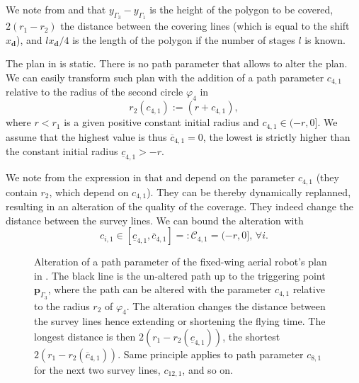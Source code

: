 We note from  and  that $y_{\Gamma_3}-y_{\Gamma_1}$ is the height of the polygon to be covered, $2(r_1-r_2)$ the distance between the covering lines (which is equal to the shift $x_\mathbf{d}$), and $lx_\mathbf{d}/4$ is the length of the polygon if the number of stages $l$ is known.

The plan in  is static. There is no path parameter that allows to alter the plan. We can easily transform such plan with the addition of a path parameter $c_{4,1}$ relative to the radius of the second circle $\varphi_4$ in 
\begin{equation}\label{eq:radius-dynamic}
  r_2(c_{4,1}):=(r+c_{4,1}),
\end{equation}
where $r<r_1$ is a given positive constant initial radius and $c_{4,1}\in(-r,0]$. We assume that the highest value is thus $\overline{c}_{4,1}=0$, the lowest is strictly higher than the constant initial radius $\underline{c}_{4,1}>-r$.

We note from the expression in  that  and  depend on the parameter $c_{4,1}$ (they contain $r_2$, which depend on $c_{4,1}$). They can be thereby dynamically replanned, resulting in an alteration of the quality of the coverage. They indeed change the distance between the survey lines.
We can bound the alteration with 
\begin{equation}\label{eq:path-const-c}
  c_{i,1}\in[\underline{c}_{4,1},\overline{c}_{4,1}]=:\mathcal{C}_{4,1}=(-r,0],\,\forall i.
\end{equation} 

\begin{sidewaysfigure}
  \centering
  
  \caption[Alteration of a path parameter of the fixed-wing aerial robot's plan]{Alteration of a path parameter of the fixed-wing aerial robot's plan in . The black line is the un-altered path up to the triggering point $\mathbf{p}_{\Gamma_3}$, where the path can be altered with the parameter $c_{4,1}$ relative to the radius $r_2$ of $\varphi_4$. The alteration changes the distance between the survey lines hence extending or shortening the flying time. The longest distance is then $2(r_1-r_2(\underline{c}_{4,1}))$, the shortest $2(r_1-r_2(\overline{c}_{4,1}))$. Same principle applies to path parameter $c_{8,1}$ for the next two survey lines, $c_{12,1}$, and so on.}
  \label{fig:plot5}
\end{sidewaysfigure}


